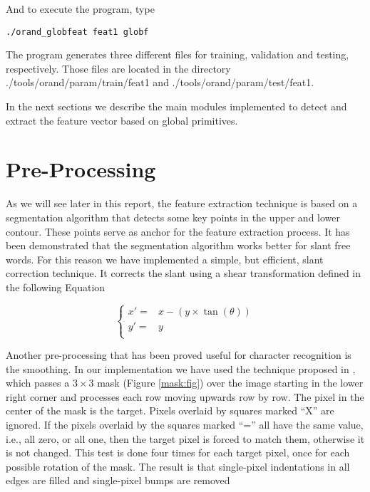 \documentclass{article}[14pt, oneside, a4paper, times]
\begin{document}
\noindent And to execute the program, type

\begin{verbatim}
./orand_globfeat feat1 globf
\end{verbatim}

The program generates three different files for training, validation and testing, respectively. Those files are located in the directory \textsf{./tools/orand/param/train/feat1} and \textsf{./tools/orand/param/test/feat1}.


In the next sections we describe the main modules implemented to detect and extract the feature vector based on global primitives. 

\section{Pre-Processing}

As we will see later in this report, the feature extraction technique is based on a segmentation algorithm that detects some key points in the upper and lower contour. These points serve as anchor for the feature extraction process. It has been demonstrated \cite{Morita2004} that the segmentation algorithm works better for slant free words. For this reason we have implemented a simple, but efficient, slant correction technique. It corrects the slant using a shear transformation defined in the following Equation

\[
\left\{
\begin{array}{ll}
 x' =&  x - (y \times \tan(\theta))   \\
 y' =&  y    \\
   
\end{array}
\right.
\]

Another pre-processing that has been proved useful for character recognition is the smoothing. In our implementation we have used the technique proposed in \cite{Strathy93}, which passes a $3 \times 3$ mask (Figure \ref{mask:fig}) over the image starting in the lower right corner and processes each row moving upwards row by row. The pixel in the center of the mask is the target. Pixels overlaid by squares marked ``X'' are ignored. If the pixels overlaid by the squares marked ``='' all have the same value, i.e., all zero, or all one, then the target pixel is forced to match them, otherwise it is not changed. This test is done four times for each target pixel, once for each possible rotation of the mask. The result is that single-pixel indentations in all edges are filled and single-pixel bumps are removed
\end{document}
